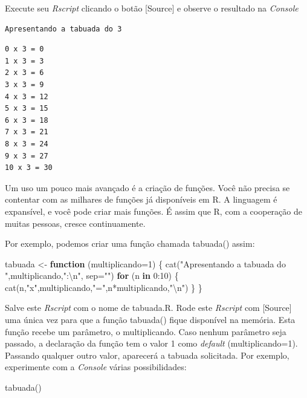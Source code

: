 \documentclass[
]{article}
\newenvironment{Shaded}{\begin{snugshade}}{\end{snugshade}}
\newcommand{\AttributeTok}[1]{\textcolor[rgb]{0.77,0.63,0.00}{#1}}
\newcommand{\ControlFlowTok}[1]{\textcolor[rgb]{0.13,0.29,0.53}{\textbf{#1}}}
\newcommand{\DecValTok}[1]{\textcolor[rgb]{0.00,0.00,0.81}{#1}}
\newcommand{\FunctionTok}[1]{\textcolor[rgb]{0.00,0.00,0.00}{#1}}
\newcommand{\NormalTok}[1]{#1}
\newcommand{\OtherTok}[1]{\textcolor[rgb]{0.56,0.35,0.01}{#1}}
\newcommand{\SpecialCharTok}[1]{\textcolor[rgb]{0.00,0.00,0.00}{#1}}
\newcommand{\StringTok}[1]{\textcolor[rgb]{0.31,0.60,0.02}{#1}}
\begin{document}
Execute seu \emph{Rscript} clicando o botão {[}Source{]} e observe o
resultado na \emph{Console}

\begin{verbatim}
Apresentando a tabuada do 3
\end{verbatim}

\begin{verbatim}
0 x 3 = 0 
1 x 3 = 3 
2 x 3 = 6 
3 x 3 = 9 
4 x 3 = 12 
5 x 3 = 15 
6 x 3 = 18 
7 x 3 = 21 
8 x 3 = 24 
9 x 3 = 27 
10 x 3 = 30 
\end{verbatim}

Um uso um pouco mais avançado é a criação de funções. Você não precisa
se contentar com as milhares de funções já disponíveis em R. A linguagem
é expansível, e você pode criar mais funções. É assim que R, com a
cooperação de muitas pessoas, cresce continuamente.

Por exemplo, podemos criar uma função chamada tabuada() assim:

\begin{Shaded}
\begin{Highlighting}[]
\NormalTok{tabuada }\OtherTok{\textless{}{-}} \ControlFlowTok{function}\NormalTok{ (}\AttributeTok{multiplicando=}\DecValTok{1}\NormalTok{)}
\NormalTok{\{}
  \FunctionTok{cat}\NormalTok{(}\StringTok{"Apresentando a tabuada do "}\NormalTok{,multiplicando,}\StringTok{":}\SpecialCharTok{\textbackslash{}n}\StringTok{"}\NormalTok{, }\AttributeTok{sep=}\StringTok{""}\NormalTok{)}
  \ControlFlowTok{for}\NormalTok{ (n }\ControlFlowTok{in} \DecValTok{0}\SpecialCharTok{:}\DecValTok{10}\NormalTok{) }
\NormalTok{  \{}
    \FunctionTok{cat}\NormalTok{(n,}\StringTok{"x"}\NormalTok{,multiplicando,}\StringTok{"="}\NormalTok{,n}\SpecialCharTok{*}\NormalTok{multiplicando,}\StringTok{"}\SpecialCharTok{\textbackslash{}n}\StringTok{"}\NormalTok{)}
\NormalTok{  \}}
\NormalTok{\}}
\end{Highlighting}
\end{Shaded}

Salve este \emph{Rscript} com o nome de tabuada.R. Rode este
\emph{Rscript} com {[}Source{]} uma única vez para que a função
tabuada() fique disponível na memória. Esta função recebe um parâmetro,
o multiplicando. Caso nenhum parâmetro seja passado, a declaração da
função tem o valor 1 como \emph{default} (multiplicando=1). Passando
qualquer outro valor, aparecerá a tabuada solicitada. Por exemplo,
experimente com a \emph{Console} várias possibilidades:

\begin{Shaded}
\begin{Highlighting}[]
\FunctionTok{tabuada}\NormalTok{()}
\end{Highlighting}
\end{Shaded}
\end{document}
